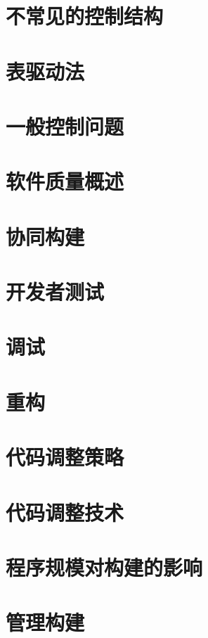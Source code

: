 \documentclass{article}
\begin{document}
\section{不常见的控制结构}

\section{表驱动法}

\section{一般控制问题}

\section{软件质量概述}

\section{协同构建}

\section{开发者测试}

\section{调试}

\section{重构}

\section{代码调整策略}

\section{代码调整技术}

\section{程序规模对构建的影响}

\section{管理构建}
\end{document}
